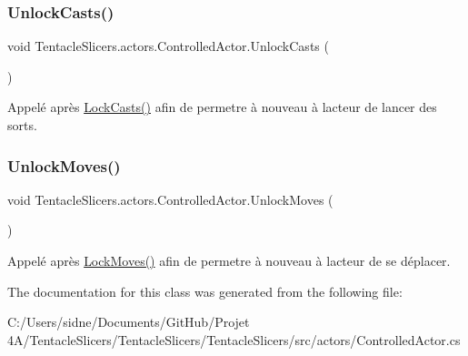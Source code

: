 \subsubsection{\texorpdfstring{Unlock\+Casts()}{UnlockCasts()}}
{\footnotesize\ttfamily void Tentacle\+Slicers.\+actors.\+Controlled\+Actor.\+Unlock\+Casts (\begin{DoxyParamCaption}{ }\end{DoxyParamCaption})}



Appelé après \hyperlink{class_tentacle_slicers_1_1actors_1_1_controlled_actor_a61e01e8419547521e6ed595bb4ca6226}{Lock\+Casts()} afin de permetre à nouveau à l\textquotesingle{}acteur de lancer des sorts. 

\mbox{\label{class_tentacle_slicers_1_1actors_1_1_controlled_actor_a14547b4a4eff36c7d604d102b1ab30e3}} 
\subsubsection{\texorpdfstring{Unlock\+Moves()}{UnlockMoves()}}
{\footnotesize\ttfamily void Tentacle\+Slicers.\+actors.\+Controlled\+Actor.\+Unlock\+Moves (\begin{DoxyParamCaption}{ }\end{DoxyParamCaption})}



Appelé après \hyperlink{class_tentacle_slicers_1_1actors_1_1_controlled_actor_a2dece877131bcd6f29898b3b7c594524}{Lock\+Moves()} afin de permetre à nouveau à l\textquotesingle{}acteur de se déplacer. 



The documentation for this class was generated from the following file\+:\begin{DoxyCompactItemize}
\item 
C\+:/\+Users/sidne/\+Documents/\+Git\+Hub/\+Projet 4\+A/\+Tentacle\+Slicers/\+Tentacle\+Slicers/\+Tentacle\+Slicers/src/actors/Controlled\+Actor.\+cs\end{DoxyCompactItemize}
